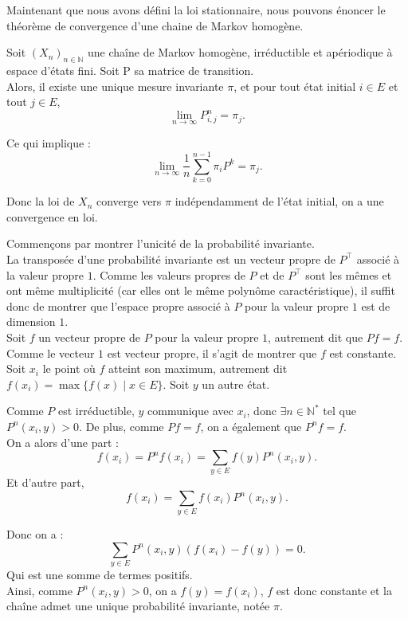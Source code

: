 \documentclass{article}
\begin{document}
Maintenant que nous avons défini la loi stationnaire, nous pouvons énoncer le théorème de convergence d'une chaine de Markov homogène. \\

\begin{tcolorbox}[colback=white,colframe=red!80!black,title=Théorème de convergence]
Soit $(X_n)_{n \in \mathbb{N}}$ une chaîne de Markov homogène, irréductible et apériodique à espace d'états fini. Soit P sa matrice de transition.\\
Alors, il existe une unique mesure invariante $\pi$, et pour tout état initial $i \in E$ et tout $j \in E$,
\[
\lim_{n \to \infty} P^n_{i,j} = \pi_j.
\]

Ce qui implique :
\[
\lim_{n \to \infty} \frac{1}{n} \sum_{k=0}^{n-1} \pi_i P^k = \pi_j.
\]

Donc la loi de $X_n$ converge vers $\pi$ indépendamment de l'état initial, on a une convergence en loi.
\end{tcolorbox}

\begin{tcolorbox}[colback=white, colframe=green!80!black, title=Démonstration, breakable]
Commençons par montrer l'unicité de la probabilité invariante. \\

La transposée d'une probabilité invariante est un vecteur propre de $P^{\top}$ associé à la valeur propre $1$.
Comme les valeurs propres de $P$ et de $P^{\top}$ sont les mêmes et ont même multiplicité (car elles ont le même polynôme caractéristique), il suffit donc de montrer que l'espace propre associé à $P$ pour la valeur propre $1$ est de dimension $1$. \\

Soit $f$ un vecteur propre de $P$ pour la valeur propre $1$, autrement dit que $Pf = f$. Comme le vecteur $1$ est vecteur propre, il s'agit de montrer que $f$ est constante. \\

Soit $x_i$ le point où $f$ atteint son maximum, autrement dit $f(x_i) = \max\{f(x) \mid x \in E\}$. Soit $y$ un autre état.

Comme $P$ est irréductible, $y$ communique avec $x_i$, donc $\exists n \in \mathbb{N}^{*}$ tel que $P^n(x_i, y) > 0$. De plus, comme $Pf = f$, on a également que $P^n f = f$. \\

On a alors d'une part :
\[
f(x_i) = P^n f(x_i) = \sum_{y \in E} f(y) P^n(x_i, y).
\]
Et d'autre part,
\[
f(x_i) = \sum_{y \in E} f(x_i) P^n(x_i, y).
\]

Donc on a :
\[
\sum_{y \in E} P^n(x_i, y) \left(f(x_i) - f(y)\right) = 0.
\]
Qui est une somme de termes positifs. \\

Ainsi, comme $P^n(x_i, y) > 0$, on a $f(y) = f(x_i)$, $f$ est donc constante et la chaîne admet une unique probabilité invariante, notée $\pi$.
\end{tcolorbox}
\end{document}
